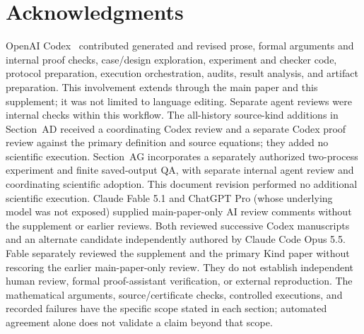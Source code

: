 \documentclass[11pt]{article}
\begin{document}


















\clearpage
\section*{Acknowledgments}
OpenAI Codex~\cite{codex} contributed generated and revised prose,
formal arguments and internal proof checks, case/design exploration,
experiment and checker code, protocol preparation, execution orchestration,
audits, result analysis, and artifact preparation. This involvement extends through the main
paper and this supplement; it was not limited to language editing.
Separate agent reviews were internal checks within this workflow.
The all-history source-kind additions in Section~AD received a coordinating
Codex review and a separate Codex proof review against the primary definition
and source equations; they added no scientific execution.
Section~AG incorporates a separately authorized two-process experiment
and finite saved-output QA, with separate internal agent review and
coordinating scientific adoption. This document revision performed no
additional scientific execution.
Claude Fable 5.1 and ChatGPT Pro (whose underlying model was not exposed)
supplied main-paper-only AI review comments without the supplement or
earlier reviews. Both reviewed successive Codex manuscripts and an alternate
candidate independently authored by Claude Code Opus 5.5.
Fable separately reviewed the supplement and the primary Kind paper without
rescoring the earlier main-paper-only review.
They do not establish independent human review, formal proof-assistant
verification, or external reproduction. The mathematical arguments,
source/certificate checks, controlled executions, and recorded failures
have the specific scope stated in each section; automated agreement
alone does not validate a claim beyond that scope.
\end{document}
